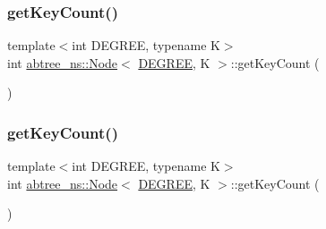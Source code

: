 \subsubsection{\texorpdfstring{get\+Key\+Count()}{getKeyCount()}\hspace{0.1cm}{\footnotesize\ttfamily [1/2]}}
{\footnotesize\ttfamily template$<$int D\+E\+G\+R\+EE, typename K$>$ \\
int \hyperlink{structabtree__ns_1_1Node}{abtree\+\_\+ns\+::\+Node}$<$ \hyperlink{brown__sigouin__abtree__kcas_2adapter_8h_a5d88b17d70c985f2f2b8e987037fd6dd}{D\+E\+G\+R\+EE}, K $>$\+::get\+Key\+Count (\begin{DoxyParamCaption}{ }\end{DoxyParamCaption})\hspace{0.3cm}{\ttfamily [inline]}}

\mbox{\label{structabtree__ns_1_1Node_a17222fc44db1651a08225e97bab6644e}} 
\subsubsection{\texorpdfstring{get\+Key\+Count()}{getKeyCount()}\hspace{0.1cm}{\footnotesize\ttfamily [2/2]}}
{\footnotesize\ttfamily template$<$int D\+E\+G\+R\+EE, typename K$>$ \\
int \hyperlink{structabtree__ns_1_1Node}{abtree\+\_\+ns\+::\+Node}$<$ \hyperlink{brown__sigouin__abtree__kcas_2adapter_8h_a5d88b17d70c985f2f2b8e987037fd6dd}{D\+E\+G\+R\+EE}, K $>$\+::get\+Key\+Count (\begin{DoxyParamCaption}{ }\end{DoxyParamCaption})\hspace{0.3cm}{\ttfamily [inline]}}

\mbox{\label{structabtree__ns_1_1Node_a5cf6c8acd36258e0bb925f2ae13ebd80}} 
